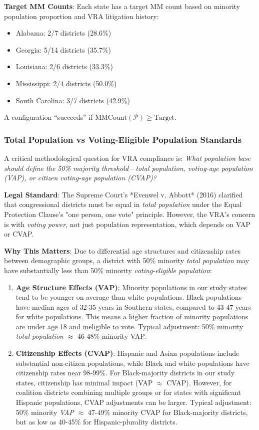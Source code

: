 \textbf{Target MM Counts}: Each state has a target MM count based on minority population proportion and VRA litigation history:
\begin{itemize}
    \item Alabama: 2/7 districts (28.6\%)
    \item Georgia: 5/14 districts (35.7\%)
    \item Louisiana: 2/6 districts (33.3\%)
    \item Mississippi: 2/4 districts (50.0\%)
    \item South Carolina: 3/7 districts (42.9\%)
\end{itemize}

A configuration ``succeeds'' if $\text{MMCount}(\mathcal{P}) \geq \text{Target}$.

\subsubsection{Total Population vs Voting-Eligible Population Standards}

A critical methodological question for VRA compliance is: \emph{What population base should define the 50\% majority threshold---total population, voting-age population (VAP), or citizen voting-age population (CVAP)?}

\textbf{Legal Standard}: The Supreme Court's *Evenwel v. Abbott* (2016) clarified that congressional districts must be equal in \emph{total population} under the Equal Protection Clause's "one person, one vote" principle. However, the VRA's concern is with \emph{voting power}, not just population representation, which depends on VAP or CVAP.

\textbf{Why This Matters}: Due to differential age structures and citizenship rates between demographic groups, a district with 50\% minority \emph{total population} may have substantially less than 50\% minority \emph{voting-eligible population}:

\begin{enumerate}
    \item \textbf{Age Structure Effects (VAP)}: Minority populations in our study states tend to be younger on average than white populations. Black populations have median ages of 32-35 years in Southern states, compared to 43-47 years for white populations. This means a higher fraction of minority populations are under age 18 and ineligible to vote. Typical adjustment: 50\% minority \emph{total population} $\approx$ 46-48\% minority VAP.

    \item \textbf{Citizenship Effects (CVAP)}: Hispanic and Asian populations include substantial non-citizen populations, while Black and white populations have citizenship rates near 98-99\%. For Black-majority districts in our study states, citizenship has minimal impact (VAP $\approx$ CVAP). However, for coalition districts combining multiple groups or for states with significant Hispanic populations, CVAP adjustments can be larger. Typical adjustment: 50\% minority \emph{VAP} $\approx$ 47-49\% minority CVAP for Black-majority districts, but as low as 40-45\% for Hispanic-plurality districts.
\end{enumerate}

